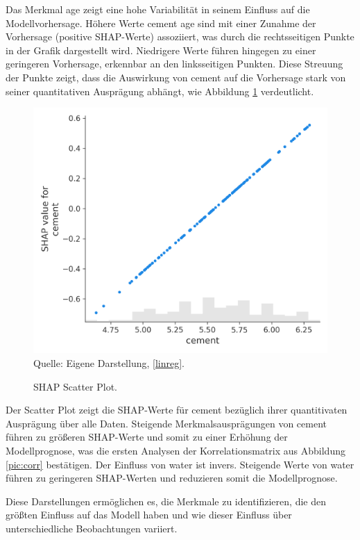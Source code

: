 Das Merkmal age zeigt eine hohe Variabilität in seinem Einfluss auf die Modellvorhersage. 
Höhere Werte cement age sind mit einer Zunahme der Vorhersage (positive SHAP-Werte) assoziiert, 
was durch die rechtsseitigen Punkte in der Grafik dargestellt wird. 
Niedrigere Werte führen hingegen zu einer geringeren Vorhersage, 
erkennbar an den linksseitigen Punkten. Diese Streuung der Punkte zeigt, 
dass die Auswirkung von cement auf die Vorhersage stark von seiner quantitativen Ausprägung abhängt, 
wie Abbildung \ref{pic:shap_scatter} verdeutlicht. 

\begin{figure}[!h]
    \caption{SHAP Scatter Plot.}
    \includegraphics[width=1\textwidth]{../scripts/images/shap_scatter_plot.png}
    Quelle: Eigene Darstellung, \ref{linreg}.
    \label{pic:shap_scatter}
\end{figure}

Der Scatter Plot zeigt die SHAP-Werte für cement bezüglich ihrer quantitivaten Ausprägung über alle 
Daten. Steigende Merkmalsausprägungen von cement führen zu größeren SHAP-Werte und somit zu einer Erhöhung der 
Modellprognose, was die ersten Analysen der Korrelationsmatrix aus Abbildung \ref{pic:corr} bestätigen. Der Einfluss von
water ist invers. Steigende Werte von water führen zu geringeren SHAP-Werten und reduzieren somit die 
Modellprognose. 

Diese Darstellungen ermöglichen es, die Merkmale zu identifizieren, 
die den größten Einfluss auf das Modell haben und wie dieser Einfluss über 
unterschiedliche Beobachtungen variiert.

